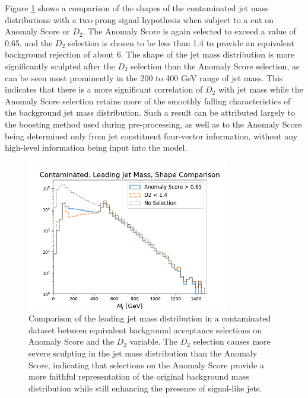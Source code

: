 \documentclass[12pt, a4paper]{article}
\begin{document}
Figure \ref{fig:d2_comp} shows a comparison of the shapes of the contaminated jet mass distributions with a two-prong signal hypothesis when subject to a cut on Anomaly Score or $D_2$. The Anomaly Score is again selected to exceed a value of 0.65, and the $D_2$ selection is chosen to be less than 1.4 to provide an equivalent background rejection of about 6. The shape of the jet mass distribution is more significantly sculpted after the $D_2$ selection than the Anomaly Score selection, as can be seen most prominently in the 200 to 400 GeV range of jet mass. This indicates that there is a more significant correlation of $D_2$ with jet mass while the Anomaly Score selection retains more of the smoothly falling characteristics of the background jet mass distribution. Such a result can be attributed largely to the boosting method used during pre-processing, as well as to the Anomaly Score being determined only from jet constituent four-vector information, without any high-level information being input into the model. 

\begin{figure}[H]
	\begin{center}
		\includegraphics[width=250pt]{imgs/bugfix/2Prong_Contaminated_10p0_J_Mass_EventScore0p65_Multi_D2Comp_Lead_SaveForPaper.png}
	\end{center}
	\caption{Comparison of the leading jet mass distribution in a contaminated dataset between equivalent background acceptance selections on Anomaly Score and the $D_2$ variable. The $D_2$ selection causes more severe sculpting in the jet mass distribution than the Anomaly Score, indicating that selections on the Anomaly Score provide a more faithful representation of the original background mass distribution while still enhancing the presence of signal-like jets.}
	\label{fig:d2_comp}
\end{figure}
\end{document}
